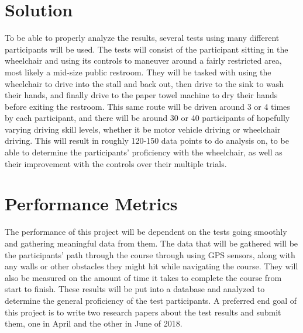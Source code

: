 \documentclass[10pt, onecolumn]{IEEEtran}
\begin{document}
    \section{Solution}
    
    To be able to properly analyze the results, several tests using many different participants will be used. The tests will consist of the participant sitting in the wheelchair and using its controls to maneuver around a fairly restricted area, most likely a mid-size public restroom. They will be tasked with using the wheelchair to drive into the stall and back out, then drive to the sink to wash their hands, and finally drive to the paper towel machine to dry their hands before exiting the restroom. This same route will be driven around 3 or 4 times by each participant, and there will be around 30 or 40 participants of hopefully varying driving skill levels, whether it be motor vehicle driving or wheelchair driving. This will result in roughly 120-150 data points to do analysis on, to be able to determine the participants' proficiency with the wheelchair, as well as their improvement with the controls over their multiple trials.
    
    \vspace{1cm}
    
    \section{Performance Metrics}
    
    The performance of this project will be dependent on the tests going smoothly and gathering meaningful data from them. The data that will be gathered will be the participants' path through the course through using GPS sensors, along with any walls or other obstacles they might hit while navigating the course. They will also be measured on the amount of time it takes to complete the course from start to finish. These results will be put into a database and analyzed to determine the general proficiency of the test participants. A preferred end goal of this project is to write two research papers about the test results and submit them, one in April and the other in June of 2018.
\end{document}
